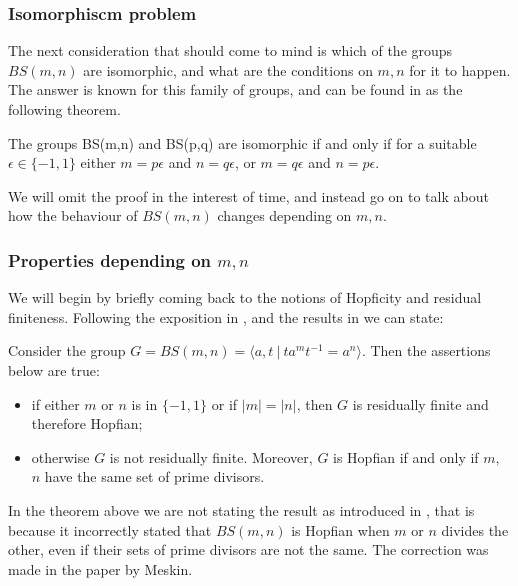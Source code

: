 
\subsubsection{Isomorphiscm problem}
The next consideration that should come to mind is which of the groups $BS(m,n)$ are isomorphic, and what are the conditions on $m,n$ for it to happen. The answer is known for this family of groups, and can be found in \cite{Mol91} as the following theorem.

\begin{theorem} \label{BSisom}
    The groups BS(m,n) and BS(p,q) are isomorphic if and only if for a suitable $\epsilon \in \{-1,1\}$ either $m = p\epsilon$ and $n = q\epsilon$, or $m = q\epsilon$ and $n = p\epsilon$.
\end{theorem}

We will omit the proof in the interest of time, and instead go on to talk about how the behaviour of $BS(m,n)$ changes depending on $m,n$.

\subsubsection{Properties depending on $m,n$}
We will begin by briefly coming back to the notions of Hopficity and residual finiteness. Following the exposition in \cite[III.21]{Ha00}, and the results in \cite{CoLe83} we can state:

\begin{theorem}
    Consider the group $G = BS(m,n) = \langle a,t \: | \: ta^mt^{-1} = a^n \rangle$. Then the assertions below are true:
    \begin{itemize}
        \item if either $m$ or $n$ is in $\{-1,1\}$ or if $|m| = |n|$, then $G$ is residually finite and therefore Hopfian;
        \item otherwise $G$ is not residually finite. Moreover, $G$ is Hopfian if and only if $m$, $n$ have the same set of prime divisors. 
    \end{itemize}
\end{theorem}

\begin{remark}
    In the theorem above we are not stating the result as introduced in \cite{BaSo62}, that is because it incorrectly stated that $BS(m,n)$ is Hopfian when $m$ or $n$ divides the other, even if their sets of prime divisors are not the same. The correction was made in the paper \cite{Me72} by Meskin.
\end{remark}

